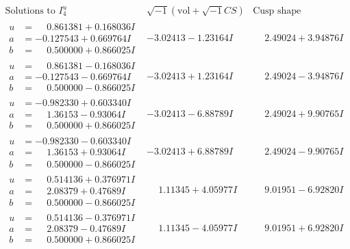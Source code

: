 \documentclass[1p]{elsarticle_modified}
\theoremstyle{definition}
\newcommand{\I}{\sqrt{-1}}
\begin{document}
$$\begin{array}{c|c|c}  
\text{Solutions to }I^u_{4}& \I (\text{vol} + \sqrt{-1}CS) & \text{Cusp shape}\\
 \hline 
\begin{aligned}
u &= \phantom{-}0.861381 + 0.168036 I \\
a &= -0.127543 + 0.669764 I \\
b &= \phantom{-}0.500000 + 0.866025 I\end{aligned}
 & -3.02413 - 1.23164 I & \phantom{-}2.49024 + 3.94876 I \\ \hline\begin{aligned}
u &= \phantom{-}0.861381 - 0.168036 I \\
a &= -0.127543 - 0.669764 I \\
b &= \phantom{-}0.500000 - 0.866025 I\end{aligned}
 & -3.02413 + 1.23164 I & \phantom{-}2.49024 - 3.94876 I \\ \hline\begin{aligned}
u &= -0.982330 + 0.603340 I \\
a &= \phantom{-}1.36153 - 0.93064 I \\
b &= \phantom{-}0.500000 + 0.866025 I\end{aligned}
 & -3.02413 - 6.88789 I & \phantom{-}2.49024 + 9.90765 I \\ \hline\begin{aligned}
u &= -0.982330 - 0.603340 I \\
a &= \phantom{-}1.36153 + 0.93064 I \\
b &= \phantom{-}0.500000 - 0.866025 I\end{aligned}
 & -3.02413 + 6.88789 I & \phantom{-}2.49024 - 9.90765 I \\ \hline\begin{aligned}
u &= \phantom{-}0.514136 + 0.376971 I \\
a &= \phantom{-}2.08379 + 0.47689 I \\
b &= \phantom{-}0.500000 - 0.866025 I\end{aligned}
 & \phantom{-}1.11345 + 4.05977 I & \phantom{-}9.01951 - 6.92820 I \\ \hline\begin{aligned}
u &= \phantom{-}0.514136 - 0.376971 I \\
a &= \phantom{-}2.08379 - 0.47689 I \\
b &= \phantom{-}0.500000 + 0.866025 I\end{aligned}
 & \phantom{-}1.11345 - 4.05977 I & \phantom{-}9.01951 + 6.92820 I \\ \hline\begin{aligned}

\end{aligned}
\end{array}$$
\end{document}
